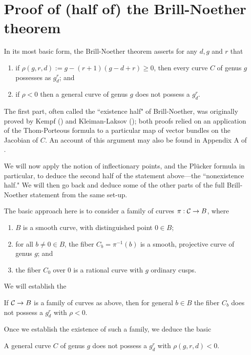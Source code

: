 \section{Proof of (half of) the Brill-Noether theorem}

In its most basic form, the Brill-Noether theorem asserts for any $d, g$ and $r$ that
\begin{enumerate}
\item if $\rho(g,r,d) := g - (r+1)(g-d+r) \geq 0$, then every curve $C$ of genus $g$ possesses as $g^r_d$; and
\item if $\rho < 0$ then a general curve of genus $g$ does not possess a $g^r_d$.
\end{enumerate}

The first part, often called the ``existence half" of Brill-Noether, was originally proved by Kempf (\cite{}) and Kleiman-Laksov (\cite{}); both proofs relied on an application of the Thom-Porteous formula to a particular map of vector bundles on the Jacobian of $C$. An account of this argument may also be found in Appendix A of \cite{}. 

We will now apply the notion of inflectionary points, and the Pl\"ucker formula in particular, to deduce the second half of the statement above---the ``nonexistence half." We will then go back and deduce some of the other parts of the full Brill-Noether statement from the same set-up.

The basic approach here is to consider a family of curves $\pi : \mathcal C \to B$, where
\begin{enumerate}
\item $B$ is a smooth curve, with distinguished point $0 \in B$;
\item for all $b \neq 0 \in B$, the fiber $C_b = \pi^{-1}(b)$ is a smooth, projective curve of genus $g$;  and
\item the fiber $C_0$ over $0$ is a rational curve with $g$ ordinary cusps.
\end{enumerate}

We will establish the

\begin{lemma}\label{BN in family}
If $\mathcal C \to B$ is a family of curves as above, then for general $b \in B$ the fiber $C_b$ does not possess a $g^r_d$ with $\rho < 0$.
\end{lemma}

Once we establish the existence of such a family, we deduce the basic

\begin{theorem}\label{bare-bones BN}
A general curve $C$ of genus $g$ does not possess a $g^r_d$ with $\rho(g,r,d) < 0$.
\end{theorem}


